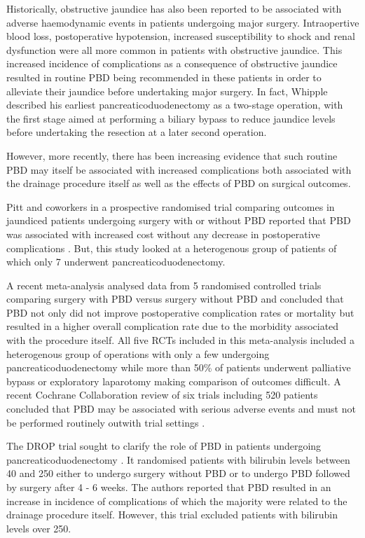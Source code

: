Historically, obstructive jaundice has also been reported to be associated with adverse haemodynamic events in patients undergoing major surgery. 
Intraopertive blood loss, postoperative hypotension, increased susceptibility to shock and renal dysfunction were all more common in patients with obstructive jaundice. 
This increased incidence of complications as a consequence of obstructive jaundice resulted in routine PBD being recommended in these patients in order to alleviate their jaundice before undertaking major surgery. 
In fact, Whipple described his earliest pancreaticoduodenectomy as a two-stage operation, with the first stage aimed at performing a biliary bypass to reduce jaundice levels before undertaking the resection at a later second operation.

However, more recently, there has been increasing evidence that such routine PBD may itself be associated with increased complications both associated with the drainage procedure itself as well as the effects of PBD on surgical outcomes.

Pitt and coworkers in a prospective randomised trial comparing outcomes in jaundiced patients undergoing surgery with or without PBD reported that PBD was associated with increased cost without any decrease in postoperative complications \parencite{pitt_does_1985}. 
But, this study looked at a heterogenous group of patients of which only 7 underwent pancreaticoduodenectomy.

A recent meta-analysis \parencite{sewnath_meta-analysis_2002} analysed data from 5 randomised controlled trials comparing surgery with PBD versus surgery without PBD and concluded that PBD not only did not improve postoperative complication rates or mortality but resulted in a higher overall complication rate due to the morbidity associated with the procedure itself. 
All five RCTs included in this meta-analysis included a heterogenous group of operations with only a few undergoing pancreaticoduodenectomy while more than 50\% of patients underwent palliative bypass or exploratory laparotomy making comparison of outcomes difficult. 
A recent Cochrane Collaboration review of six trials including 520 patients concluded that PBD may be associated with serious adverse events and must not be performed routinely outwith trial settings \parencite{wang_preoperative_2008}.

The DROP trial sought to clarify the role of PBD in patients undergoing pancreaticoduodenectomy \parencite{van_der_gaag_preoperative_2010}. 
It randomised patients with bilirubin levels between 40 and 250 either to undergo surgery without PBD or to undergo PBD followed by surgery after 4 - 6 weeks. 
The authors reported that PBD resulted in an increase in incidence of complications of which the majority were related to the drainage procedure itself. 
However, this trial excluded patients with bilirubin levels over 250.

